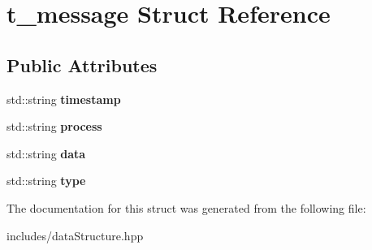 \section{t\+\_\+message Struct Reference}
\label{structt__message}
\subsection*{Public Attributes}
\begin{DoxyCompactItemize}
\item 
\mbox{\label{structt__message_a78226b09cca8516d9b85cec444f92f61}} 
std\+::string {\bfseries timestamp}
\item 
\mbox{\label{structt__message_a09c8c7051459f46f1ab5fee1d5ec0ef8}} 
std\+::string {\bfseries process}
\item 
\mbox{\label{structt__message_ad5326c0efe685fcee7b5db0cbe4ae86b}} 
std\+::string {\bfseries data}
\item 
\mbox{\label{structt__message_a781cd3a5d2b77bf1312e664386b0616d}} 
std\+::string {\bfseries type}
\end{DoxyCompactItemize}


The documentation for this struct was generated from the following file\+:\begin{DoxyCompactItemize}
\item 
includes/data\+Structure.\+hpp\end{DoxyCompactItemize}
